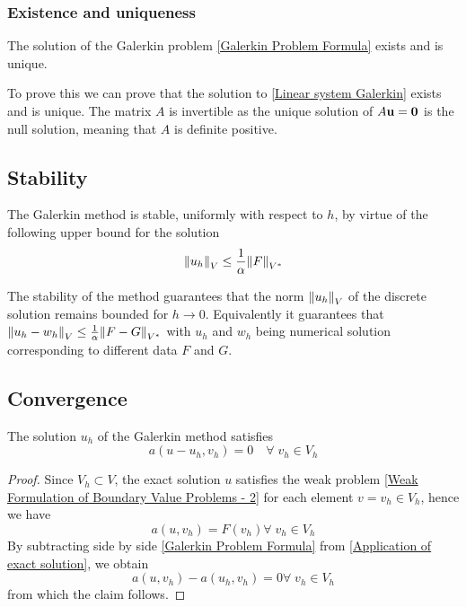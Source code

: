 \subsubsection*{Existence and uniqueness}

    \begin{corollary}
    The solution of the Galerkin problem \eqref{Galerkin Problem Formula} exists and is unique.
\end{corollary}

To prove this we can prove that the solution to \eqref{Linear system Galerkin} exists and is unique. The matrix \(A\) is invertible as the unique solution of \(A\textbf{u} = \textbf{0}\) is the null solution, meaning that \(A\) is definite positive.
\subsection*{Stability}
\begin{corollary}
    The Galerkin method is stable, uniformly with respect to \(h\), by virtue of the following upper bound for the solution
    \[
        \norm{u_h}_V \leq \frac{1}{\alpha}\norm{F}_{V^*}
    \]
\end{corollary}
The stability of the method guarantees that the norm \(\norm{u_h}_V\) of the discrete solution remains bounded for \(h \to 0\). Equivalently it guarantees that \(\norm{u_h-w_h}_V \leq \frac{1}{\alpha}\norm{F-G}_{V^*}\) with \(u_h\) and \(w_h\) being numerical solution corresponding to different data \(F\) and \(G\).
\subsection*{Convergence}

    \begin{lemma}
    The solution \(u_h\) of the Galerkin method satisfies 
    \begin{equation}
        a(u-u_h, v_h) = 0 \quad \forall \; v_h \in V_h \label{Galerkin orthogonality}
    \end{equation}
\end{lemma}

\begin{proof}
    Since \(V_h \subset V\), the exact solution \(u\) satisfies the weak problem \eqref{Weak Formulation of Boundary Value Problems - 2} for each element \(v = v_h \in V_h\), hence we have 
    \begin{equation}
        a(u, v_h) = F(v_h) \forall \; v_h \in V_h \label{Application of exact solution}
    \end{equation}
    By subtracting side by side \eqref{Galerkin Problem Formula} from \eqref{Application of exact solution}, we obtain 
    \[
        a(u,v_h)-a(u_h, v_h) = 0 \forall \; v_h \in V_h
    \]
    from which the claim follows.
\end{proof}


